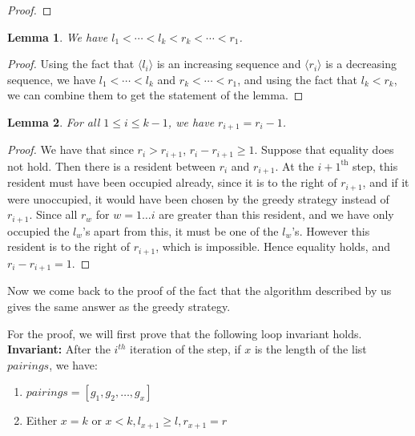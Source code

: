 \documentclass[answers]{exam}
\newtheorem{lemma}{Lemma}
\newcommand{\nl}{\vspace{0.2cm}\\}
\begin{document}
\begin{questions}
\begin{solution}
\begin{proof}
\end{proof}
\begin{lemma}
We have $l_1 < \cdots < l_k < r_k < \cdots < r_1$.
\end{lemma}
\begin{proof}
Using the fact that $\langle l_i \rangle$ is an increasing sequence and $\langle r_i \rangle$ is a decreasing sequence, we have $l_1 < \cdots < l_k$ and $r_k < \cdots < r_1$, and using the fact that $l_k < r_k$, we can combine them to get the statement of the lemma.
\end{proof}
\begin{lemma}
For all $1 \le i \le k - 1$, we have $r_{i + 1} = r_i - 1$.
\end{lemma}
\begin{proof}
We have that since $r_i > r_{i + 1}$, $r_i - r_{i + 1} \ge 1$. Suppose that equality does not hold. Then there is a resident between $r_i$ and $r_{i + 1}$. At the $i+1^{\mathrm{th}}$ step, this resident must have been occupied already, since it is to the right of $r_{i + 1}$, and if it were unoccupied, it would have been chosen by the greedy strategy instead of $r_{i + 1}$. Since all $r_w$ for $w = 1 \dots i$ are greater than this resident, and we have only occupied the $l_w$'s apart from this, it must be one of the $l_w$'s. However this resident is to the right of $r_{i + 1}$, which is impossible. Hence equality holds, and $r_i - r_{i + 1} = 1$.
\end{proof}

Now we come back to the proof of the fact that the algorithm described by us gives the same answer as the greedy strategy.

For the proof, we will first prove that the following loop invariant holds.\nl
\textbf{Invariant:} After the $i^{th}$ iteration of the step, if $x$ is the length of the list $\mathit{pairings}$, we have:
\begin{enumerate}
    \item $\mathit{pairings} = \left[ g_1, g_2, \dots, g_x \right]$
    \item Either $x = k$ or $x < k, l_{x + 1} \ge l, r_{x + 1} = r$
\end{enumerate}


\end{solution}
\end{questions}
\end{document}
